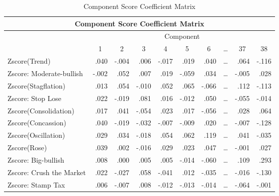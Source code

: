 \documentclass[review,3p,times,12pt,number]{elsarticle}
\begin{document}
\begin{table}[htbp]
  \scriptsize
  \centering
  \caption{Component Score Coefficient Matrix}
    \begin{tabular}{rrrrrrrrrr}
    \toprule
    \multicolumn{10}{c}{\textbf{Component Score Coefficient Matrix}} \\
    \midrule
    \multicolumn{1}{l}{\multirow{2}[4]{*}{}} & \multicolumn{9}{c}{Component} \\
    \multicolumn{1}{l}{} & \multicolumn{1}{c}{1} & \multicolumn{1}{c}{2} & \multicolumn{1}{c}{3} & \multicolumn{1}{c}{4} & \multicolumn{1}{c}{5} & \multicolumn{1}{c}{6} & \multicolumn{1}{c}{\ldots} & \multicolumn{1}{c}{37} & \multicolumn{1}{c}{38} \\
    \multicolumn{1}{l}{Zscore(Trend)} & .040  & -.004 & .006  & -.017 & .019  & .040  & \ldots     & .064  & -.116 \\
    \multicolumn{1}{l}{Zscore:  Moderate-bullish} & -.002 & .052  & .007  & .019  & -.059 & .034  & \ldots     & -.005 & .028 \\
    \multicolumn{1}{l}{Zscore(Stagflation)} & .013  & .054  & -.010 & .052  & .065  & -.066 & \ldots     & .112  & -.113 \\
    \multicolumn{1}{l}{Zscore:  Stop Lose} & .022  & -.019 & .081  & .016  & -.012 & .050  & \ldots     & -.055 & -.014 \\
    \multicolumn{1}{l}{Zscore(Consolidation)} & .017  & .041  & -.054 & .023  & .017  & -.056 & \ldots     & .028  & .064 \\
    \multicolumn{1}{l}{Zscore(Concassion)} & .040  & -.019 & -.032 & -.007 & -.009 & .020  & \ldots     & -.007 & -.128 \\
    \multicolumn{1}{l}{Zscore(Oscillation)} & .029  & .034  & -.018 & .054  & .062  & .119  & \ldots     & .041  & -.035 \\
    \multicolumn{1}{l}{Zscore(Rose)} & .039  & .002  & -.016 & .029  & .023  & .047  & \ldots     & -.001 & .027 \\
    \multicolumn{1}{l}{Zscore:  Big-bullish} & .008  & .000  & .005  & .005  & -.014 & -.060 & \ldots     & .109  & .293 \\
    \multicolumn{1}{l}{Zscore:  Crush the Market} & .022  & -.027 & .058  & -.041 & .012  & -.035 & \ldots     & -.016 & -.130 \\
    \multicolumn{1}{l}{Zscore:  Stamp Tax} & .006  & -.007 & .008  & -.012 & -.013 & -.014 & \ldots     & -.064 & -.001 \\

\end{tabular}
\end{table}
\end{document}
